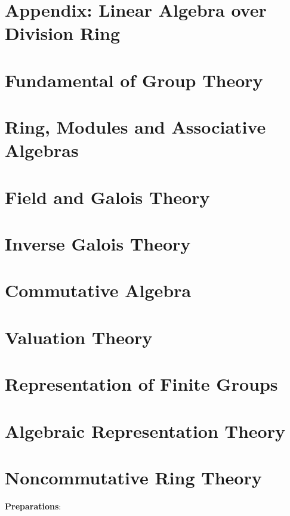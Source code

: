 \documentclass{ModulEN}
\begin{document}
		
		
	\part{Appendix: Linear Algebra over Division Ring}
	
		
		
		
	
	\part{Fundamental of Group Theory}
	
	\part{Ring, Modules and Associative Algebras}
	
		
	
	\part{Field and Galois Theory}
		
	
	
	\part{Inverse Galois Theory}
		
	\part{Commutative Algebra}
	
		
	\part{Valuation Theory}
		
		
	\part{Representation of Finite Groups}
		
	\part{Algebraic Representation Theory}
		
	
	\part{Noncommutative Ring Theory}
		\textbf{Preparations}:
		
\end{document}
